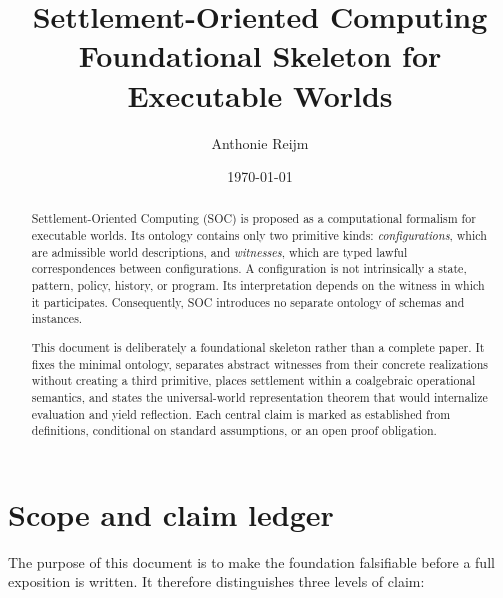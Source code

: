 \documentclass[11pt]{article}
\title{\textbf{Settlement-Oriented Computing}\\
Foundational Skeleton for Executable Worlds}
\author{Anthonie Reijm}
\date{\today}
\theoremstyle{remark}
\begin{document}
\maketitle

\begin{abstract}
Settlement-Oriented Computing (SOC) is proposed as a computational formalism
for executable worlds. Its ontology contains only two primitive kinds:
\emph{configurations}, which are admissible world descriptions, and
\emph{witnesses}, which are typed lawful correspondences between
configurations. A configuration is not intrinsically a state, pattern, policy,
history, or program. Its interpretation depends on the witness in which it
participates. Consequently, SOC introduces no separate ontology of schemas and
instances.

This document is deliberately a foundational skeleton rather than a complete
paper. It fixes the minimal ontology, separates abstract witnesses from their
concrete realizations without creating a third primitive, places settlement
within a coalgebraic operational semantics, and states the universal-world
representation theorem that would internalize evaluation and yield reflection.
Each central claim is marked as established from definitions, conditional on
standard assumptions, or an open proof obligation.
\end{abstract}

\section{Scope and claim ledger}

The purpose of this document is to make the foundation falsifiable before a
full exposition is written. It therefore distinguishes three levels of claim:
\end{document}
